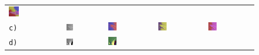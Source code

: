 \begin{figure}[h!]
\begin{tabular}{m{15pt}m{}m{}m{}m{}}
		\includegraphics[width=0.2\textwidth]{images/gen/pooling_layers/p03_02.png_4.png} \\
		\texttt{c)} &
		\includegraphics[width=0.2\textwidth]{images/p03/p03_03.png} &
		\includegraphics[width=0.2\textwidth]{images/gen/pooling_layers/p03_03.png_1.png} &
		\includegraphics[width=0.2\textwidth]{images/gen/pooling_layers/p03_03.png_2.png} &
		\includegraphics[width=0.2\textwidth]{images/gen/pooling_layers/p03_03.png_4.png} \\
		\texttt{d)} &
		\includegraphics[width=0.2\textwidth]{images/p03/p03_04.png} &
		\includegraphics[width=0.2\textwidth]{images/gen/pooling_layers/p03_04.png_1.png} &

\end{tabular}
\end{figure}
